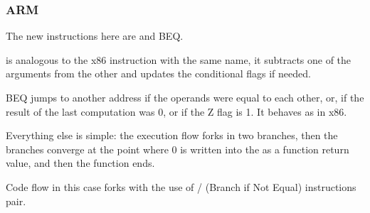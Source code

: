 \subsubsection{ARM}





The new instructions here are \CMP and \ac{BEQ}.

\CMP is analogous to the x86 instruction with the same name, it subtracts one of the arguments from the other and updates the conditional flags if needed.

\ac{BEQ} jumps to another address if the operands were equal to each other, or,
if the result of the last computation was 0, or if the Z flag is 1.
It behaves as \JZ in x86.

Everything else is simple: the execution flow forks in two branches, then the branches
converge at the point where 0 is written into the  as a function return value, and then the function ends.




Code flow in this case forks with the use of / (Branch if Not Equal) instructions pair.

